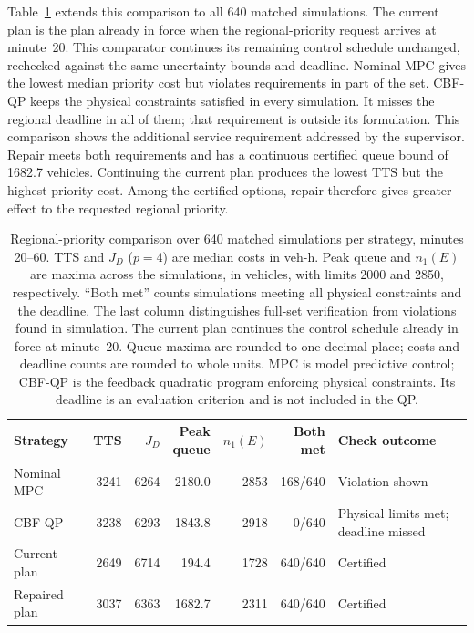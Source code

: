 \documentclass[final]{cas-sc}
\theoremstyle{definition}
\theoremstyle{plain}
\theoremstyle{definition}
\theoremstyle{plain}
\begin{document}
Table~\ref{tab:benchmark-conflict} extends this comparison to all 640
matched simulations. The current plan is the plan already in force
when the regional-priority request arrives at minute~20. This
comparator continues its remaining control schedule unchanged,
rechecked against the same uncertainty bounds and deadline.
Nominal MPC gives the lowest median priority cost
but violates requirements in part of the set. CBF-QP keeps the physical
constraints satisfied in every simulation. It misses the regional
deadline in all of them; that requirement is outside its formulation.
This comparison shows the additional service
requirement addressed by the supervisor.
Repair meets both requirements and has a continuous certified queue
bound of 1682.7 vehicles. Continuing the current plan produces the
lowest TTS but the highest priority cost. Among the certified options,
repair therefore gives greater effect to the requested regional priority.

\begin{table}[pos=!htb]
\centering\small
\caption{Regional-priority comparison over 640 matched simulations per
strategy, minutes 20--60. TTS and $J_D$ ($p=4$) are median costs in
veh-h. Peak queue and $n_1(E)$ are maxima across the simulations, in
vehicles, with limits 2000 and 2850, respectively. ``Both met'' counts
simulations meeting all physical constraints and the deadline. The
last column distinguishes full-set verification from violations
found in simulation. The current plan continues the control schedule
already in force at minute~20. Queue maxima are rounded to one
decimal place; costs and deadline counts are rounded to whole units.
MPC is model predictive control; CBF-QP is the feedback quadratic
program enforcing physical constraints. Its deadline is an evaluation
criterion and is not included in the QP.}
\label{tab:benchmark-conflict}
\setlength{\tabcolsep}{3pt}
\begin{tabularx}{\linewidth}{@{}>{\raggedright\arraybackslash}p{3.4cm}rrrrr>{\raggedright\arraybackslash}X@{}}
\toprule
Strategy & TTS & $J_D$ & \shortstack{Peak\\queue} & $n_1(E)$ & \shortstack{Both\\met} & Check outcome\\
\midrule
Nominal MPC & 3241 & 6264 & 2180.0 & 2853 & 168/640 & Violation shown\\
CBF-QP & 3238 & 6293 & 1843.8 & 2918 & 0/640 & Physical limits met; deadline missed\\
Current plan & 2649 & 6714 & 194.4 & 1728 & 640/640 & Certified\\
Repaired plan & 3037 & 6363 & 1682.7 & 2311 & 640/640 & Certified\\
\bottomrule
\end{tabularx}
\end{table}
\end{document}
